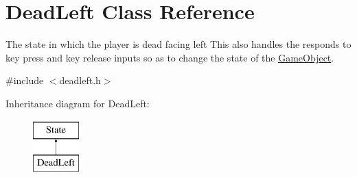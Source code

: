 \hypertarget{classDeadLeft}{\section{Dead\-Left Class Reference}
\label{classDeadLeft}
}


The state in which the player is dead facing left This also handles the responds to key press and key release inputs so as to change the state of the \hyperlink{classGameObject}{Game\-Object}.  




{\ttfamily \#include $<$deadleft.\-h$>$}

Inheritance diagram for Dead\-Left\-:\begin{figure}[H]
\begin{center}
\leavevmode
\includegraphics[height=2.000000cm]{classDeadLeft}
\end{center}
\end{figure}
